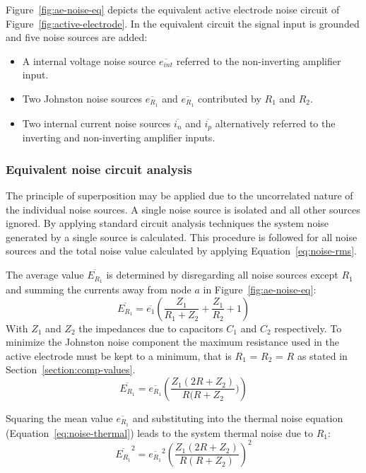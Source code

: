 Figure~\vref{fig:ae-noise-eq} depicts the equivalent active electrode
noise circuit of Figure~\vref{fig:active-electrode}. In the equivalent
circuit the signal input is grounded and five noise sources are added:
\begin{itemize}
	\item A internal voltage noise source $\overline{e_{int}}$ referred
	to the non-inverting amplifier input.

	\item Two Johnston noise sources $\overline{e_{R_1}}$ and
	$\overline{e_{R_1}}$ contributed by $R_1$ and $R_2$.

	\item Two internal current noise sources $\overline{i_n}$ and
	$\overline{i_p}$ alternatively referred to the inverting and
	non-inverting amplifier inputs.

\end{itemize}

\subsubsection{Equivalent noise circuit analysis}
The principle of superposition may be applied due to the uncorrelated
nature of the individual noise sources. A single noise source is
isolated and all other sources ignored. By applying standard circuit
analysis techniques the system noise generated by a single source is
calculated. This procedure is followed for all noise sources and the
total noise value calculated by applying Equation~\ref{eq:noise-rms}.


The average value $\overline{E_{R_1}}$ is determined by disregarding
all noise sources except $R_1$ and summing the currents away from node
$a$ in Figure~\vref{fig:ae-noise-eq}:
\begin{equation}
	\overline{E_{R_1}} = \overline{e_1}(\frac{Z_1}{R_1 + Z_2} +
	\frac{Z_1}{R_2} + 1)
	\label{eq:noise-er1t}
\end{equation}
With $Z_1$ and $Z_2$ the impedances due to capacitors $C_1$ and $C_2$
respectively. To minimize the Johnston noise component the maximum
resistance used in the active electrode must be kept to a minimum,
that is $R_1$ = $R_2$ = $R$ as stated in
Section~\ref{section:comp-values}.
\begin{equation}
	\overline{E_{R_1}} = \overline{e_{R_1}}\left(\frac{Z_1(2R +
	Z_2)}{R(R + Z_2}) \right)
\end{equation}

Squaring the mean value $\overline{e_{R_1}}$ and substituting into the
thermal noise equation (Equation~\ref{eq:noise-thermal}) leads to the
system thermal noise due to $R_1$:
\begin{equation}
		\overline{E_{R_1}}^2 = \overline{e_{R_1}}^2\left (\frac{Z_1(2R +
	Z_2)}{R(R + Z_2)} \right )^2
\end{equation}

